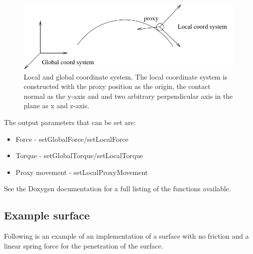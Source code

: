 \begin{figure} 
  \centering 
  \includegraphics{images/coordsystems.pdf}
  \caption{Local and global coordinate system. The local coordinate system is constructed with the proxy position as the origin, the contact normal as the y-axis and and two arbitrary perpendicular axis in the plane as x and z-axis.}
  \label{coordsystems} 
\end{figure}

The output parameters that can be set are:

\begin{itemize}
\item Force - setGlobalForce/setLocalForce
\item Torque - setGlobalTorque/setLocalTorque
\item Proxy movement - setLocalProxyMovement
\end{itemize}

See the Doxygen documentation for a full listing of the functions available.

\subsection{Example surface}
Following is an example of an implementation of a surface with no friction and a linear spring force for the penetration of the surface.   




